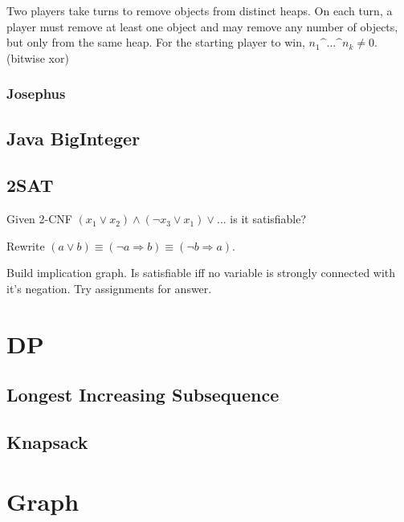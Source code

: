 \documentclass[a4paper,landscape,8pt]{article}
\begin{document}
\begin{multicols}{2}
Two players take turns to remove objects from distinct heaps. On each turn, a player must remove at least one object and may remove any number of objects, but only from the same heap. For the starting player to win, $n_1 \text{\textasciicircum{}} ... \text{\textasciicircum{}} n_k \neq 0$. (bitwise xor)

\subsubsection{Josephus}



\subsection{Java BigInteger}





\subsection{2SAT}

Given 2-CNF $(x_1 \lor x_2) \land (\lnot x_3 \lor x_1) \lor ...$ is it satisfiable?

Rewrite $(a \lor b) \equiv (\lnot a \Rightarrow b) \equiv (\lnot b \Rightarrow a)$.

Build implication graph. Is satisfiable iff no variable is strongly connected with it's negation.  Try assignments for answer.

\section{DP}

\subsection{Longest Increasing Subsequence}


\subsection{Knapsack}



\section{Graph}


\end{multicols}
\end{document}
